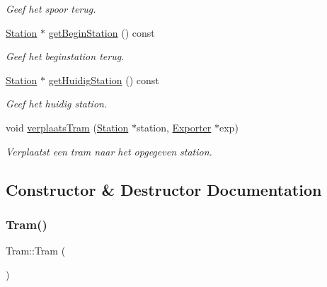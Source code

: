 \begin{DoxyCompactItemize}
\begin{DoxyCompactList}\small\item\em Geef het spoor terug. \end{DoxyCompactList}\item 
\hyperlink{class_station}{Station} $\ast$ \hyperlink{class_tram_abe386592de6a7930df75ea184b945403}{get\+Begin\+Station} () const
\begin{DoxyCompactList}\small\item\em Geef het beginstation terug. \end{DoxyCompactList}\item 
\hyperlink{class_station}{Station} $\ast$ \hyperlink{class_tram_ad04f5905ffec6ef4069b27f08c63f4b9}{get\+Huidig\+Station} () const
\begin{DoxyCompactList}\small\item\em Geef het huidig station. \end{DoxyCompactList}\item 
void \hyperlink{class_tram_ab2a78d1ff86257b8dd27a3b0abc440ee}{verplaats\+Tram} (\hyperlink{class_station}{Station} $\ast$station, \hyperlink{class_exporter}{Exporter} $\ast$exp)
\begin{DoxyCompactList}\small\item\em Verplaatst een tram naar het opgegeven station. \end{DoxyCompactList}\end{DoxyCompactItemize}


\subsection{Constructor \& Destructor Documentation}
\mbox{\label{class_tram_aad83b2e7e79d57528691bf317ab0e1ef}} 
\subsubsection{\texorpdfstring{Tram()}{Tram()}\hspace{0.1cm}{\footnotesize\ttfamily [1/2]}}
{\footnotesize\ttfamily Tram\+::\+Tram (\begin{DoxyParamCaption}{ }\end{DoxyParamCaption})}

\mbox{\label{class_tram_a0a092211c8c234c6372318a622810d2c}} 
